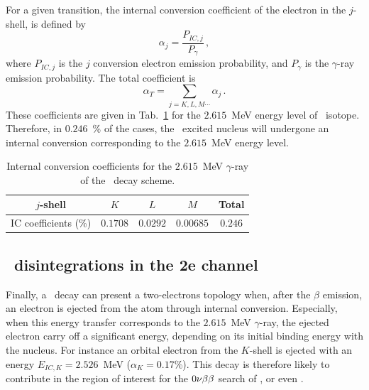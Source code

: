 For a given transition, the internal conversion coefficient of the electron in the $j$-shell, is defined by
\begin{equation}
\alpha_{j}=\frac{P_{IC, j}}{P_{\gamma}}\,,
\end{equation}
where $P_{IC,j}$ is the $j$ conversion electron emission probability, and $P_{\gamma}$ is the $\gamma$-ray emission probability.
The total coefficient is
\begin{equation}
  \alpha_{T}=\sum_{j=K,L,M\cdots}\alpha_{j}\,.
\end{equation}
These coefficients are given in Tab.~\ref{tab:IC_prob} for the $2.615$~MeV energy level of \Tl\ isotope.
Therefore, in $0.246$~\% of the cases, the \Pb\ excited nucleus will undergone an internal conversion corresponding to the $2.615$~MeV energy level.
\begin{table}[!h]
  \centering
  \begin{tabular}{|c|c|c|c|c|}
    \hline
    $j$-shell & $K$ & $L$ & $M$ & Total \\
    \hline\hline
    IC coefficients (\%) & $0.1708$ & $0.0292$ & $0.00685$ & $0.246$ \\
    \hline
  \end{tabular}
  \caption{Internal conversion coefficients for the $2.615$~MeV $\gamma$-ray of the \Tl\ decay scheme.
    \label{tab:IC_prob}}
\end{table}


\subsection{\Tl\ disintegrations in the 2e channel}

Finally, a \Tl\ decay can present a two-electrons topology when, after the $\beta$ emission, an electron is ejected from the atom through internal conversion.
Especially, when this energy transfer corresponds to the $2.615$~MeV $\gamma$-ray, the ejected electron carry off a significant energy, depending on its initial binding energy with the nucleus.
For instance an orbital electron from the $K$-shell is ejected with an energy $E_{IC,K}=2.526$~MeV (${\alpha_{K}=0.17}$\%).
This decay is therefore likely to contribute in the region of interest for the $0\nu\beta\beta$ search of \Se, or even \Nd.

